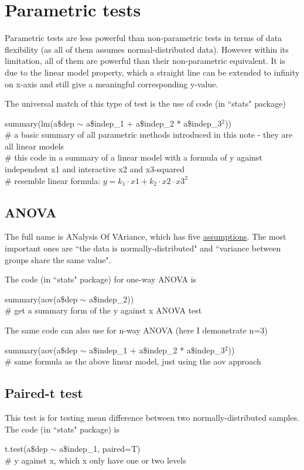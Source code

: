 \documentclass[../note.tex]{subfiles} %
\begin{document}
\section{Parametric tests}
Parametric tests are less powerful than non-parametric tests in terms of data flexibility (as all of them assumes normal-distributed data).  However within its limitation, all of them are powerful than their non-parametric equivalent.  It is due to the linear model property, which a straight line can be extended to infinity on x-axis and still give a meaningful corresponding y-value.

The universal match of this type of test is the use of code (in ``stats" package\autocite{Rcore})
\begin{code}
summary(lm(a\$dep $\sim$ a\$indep\_1 + a\$indep\_2 * a\$indep\_3$^2$))\\
\# a basic summary of all parametric methods introduced in this note - they are all linear models\\
\# this code in a summary of a linear model with a formula of y against independent x1 and interactive x2 and x3-squared\\
\# resemble linear formula: $y = k_1\cdot x1 + k_2\cdot x2\cdot x3^2$
\end{code}

\subsection{ANOVA}
The full name is ANalysis Of VAriance, which has five \href{https://www.real-statistics.com/one-way-analysis-of-variance-anova/assumptions-anova/}{assumptions}.  The most important ones are ``the data is normally-distributed" and ``variance between groups share the same value".

The code (in ``stats" package\autocite{Rcore}) for one-way ANOVA is
\begin{code}
summary(aov(a\$dep $\sim$ a\$indep\_2))\\
\# get a summary form of the y against x ANOVA test
\end{code}

The same code can also use for n-way ANOVA (here I demonstrate n=3)
\begin{code}
summary(aov(a\$dep $\sim$ a\$indep\_1 + a\$indep\_2 * a\$indep\_3$^2$))\\
\# same formula as the above linear model, just using the aov approach
\end{code}

\subsection{Paired-t test}
This test is for testing mean difference between two normally-distributed samples.  The code (in ``stats" package\autocite{Rcore}) is
\begin{code}
t.test(a\$dep $\sim$ a\$indep\_1, paired=T)\\
\# y against x, which x only have one or two levels
\end{code}
\end{document}
